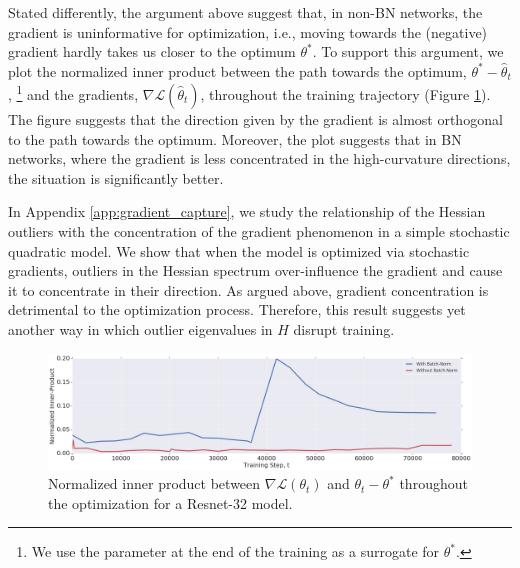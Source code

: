 \documentclass{article}
\newcommand{\loss}{\mathcal{L}}
\begin{document}
Stated differently, the argument above suggest that, in non-BN networks, the gradient is uninformative for optimization, i.e., moving towards the (negative) gradient hardly takes us closer to the optimum $\theta^*$. To support this argument, we plot the normalized inner product between the path towards the optimum, $\theta^* - \hat{\theta}_t$, \footnote{We use the parameter at the end of the training as a surrogate for $\theta^*$.} and the gradients, $\nabla \loss(\hat{\theta}_t)$, throughout the training trajectory (Figure \ref{fig:GradInf}). The figure suggests that the direction given by the gradient is almost orthogonal to the path towards the optimum. Moreover, the plot suggests that in BN networks, where the gradient is less concentrated in the high-curvature directions, the situation is significantly better.%

In Appendix \ref{app:gradient_capture}, we study the relationship of the Hessian outliers with the concentration of the gradient phenomenon in a simple stochastic quadratic model. We show that when the model is optimized via stochastic gradients, outliers in the Hessian spectrum over-influence the gradient and cause it to concentrate in their direction. As argued above, gradient concentration is detrimental to the optimization process. Therefore, this result suggests yet another way in which outlier eigenvalues in $H$ disrupt training. 


\begin{figure}[h]
\includegraphics[width=\textwidth]{Normalized_Inner_Product.png}
\vspace{-0.5cm}
\caption{Normalized inner product between $\nabla \loss(\theta_t)$ and $\theta_t - \theta^*$ throughout the optimization for a Resnet-32 model. \label{fig:GradInf}}
\end{figure}
\end{document}
